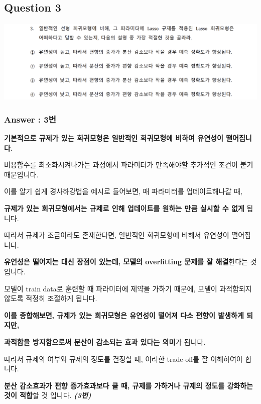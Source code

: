 \documentclass[
  letterpaper,
  DIV=11,
  numbers=noendperiod]{scrartcl}
\begin{document}
\subsection{Question 3}\label{question-3}

\includegraphics{image/machine_hw1_4.png}

\subsubsection{Answer : 3번}\label{answer-3uxbc88}

\textbf{기본적으로 규제가 있는 회귀모형은 일반적인 회귀모형에 비하여
유연성이 떨어집니다.}

비용함수를 최소화시켜나가는 과정에서 파라미터가 만족해야할 추가적인
조건이 붙기 때문입니다.

이를 알기 쉽게 경사하강법을 예시로 들어보면, 매 파라미터를
업데이트해나갈 때,

\textbf{규제가 있는 회귀모형에서는 규제로 인해 업데이트를 원하는 만큼
실시할 수 없게} 됩니다.

따라서 규제가 조금이라도 존재한다면, 일반적인 회귀모형에 비해서 유연성이
떨어집니다.

\textbf{유연성은 떨어지는 대신 장점이 있는데, 모델의 overfitting 문제를
잘 해결}한다는 것 입니다.

모델이 train data로 훈련할 때 파라미터에 제약을 가하기 때문에, 모델이
과적합되지 않도록 적정히 조절하게 됩니다.

\textbf{이를 종합해보면, 규제가 있는 회귀모형은 유연성이 떨어져 다소
편향이 발생하게 되지만,}

\textbf{과적합을 방지함으로써 분산이 감소되는 효과 있다는 의미}가
됩니다.

따라서 규제의 여부와 규제의 정도를 결정할 때, 이러한 trade-off를 잘
이해하여야 합니다.

\textbf{분산 감소효과가 편향 증가효과보다 클 때, 규제를 가하거나 규제의
정도를 강화하는 것이 적합}할 것 입니다. \textbf{\emph{(3번)}}
\end{document}
